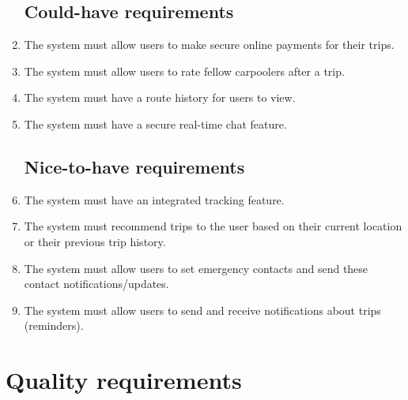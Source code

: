 \documentclass[hidelinks, 12pt, a4paper]{article}
\begin{document}
\begin{changemargin}
\begin{enumerate}[.9in,label=R.\arabic*]
        \subsection{Could-have requirements}

                \item The system must allow users to make secure online payments for their trips.
                \item The system must allow users to rate fellow carpoolers after a trip.
                \item The system must have a route history for users to view.
                \item The system must have a secure real-time chat feature.
                
        \subsection{Nice-to-have requirements}
        
                \item The system must have an integrated tracking feature.
                \item The system must recommend trips to the user based on their current location or their previous trip history.
                \item The system must allow users to set emergency contacts and send these contact notifications/updates.
                \item The system must allow users to send and receive notifications about trips (reminders).

            \end{enumerate}
            
    \end{changemargin}
    
    \newpage
\section{Quality requirements}
\end{document}
